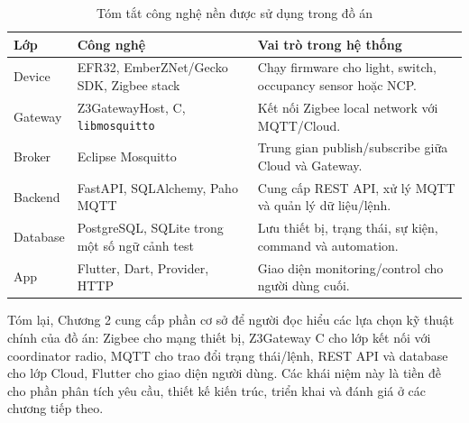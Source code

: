 \begin{table}[H]
\centering
\caption{Tóm tắt công nghệ nền được sử dụng trong đồ án}
\label{tab:ch2-tech-stack}
\begin{tabular}{|>{\raggedright\arraybackslash}p{2.8cm}|>{\raggedright\arraybackslash}p{4.2cm}|>{\raggedright\arraybackslash}p{6.2cm}|}
\hline
\textbf{Lớp} & \textbf{Công nghệ} & \textbf{Vai trò trong hệ thống} \\ \hline
Device & EFR32, EmberZNet/Gecko SDK, Zigbee stack & Chạy firmware cho light, switch, occupancy sensor hoặc NCP. \\ \hline
Gateway & Z3GatewayHost, C, \texttt{libmosquitto} & Kết nối Zigbee local network với MQTT/Cloud. \\ \hline
Broker & Eclipse Mosquitto & Trung gian publish/subscribe giữa Cloud và Gateway. \\ \hline
Backend & FastAPI, SQLAlchemy, Paho MQTT & Cung cấp REST API, xử lý MQTT và quản lý dữ liệu/lệnh. \\ \hline
Database & PostgreSQL, SQLite trong một số ngữ cảnh test & Lưu thiết bị, trạng thái, sự kiện, command và automation. \\ \hline
App & Flutter, Dart, Provider, HTTP & Giao diện monitoring/control cho người dùng cuối. \\ \hline
\end{tabular}
\end{table}

Tóm lại, Chương 2 cung cấp phần cơ sở để người đọc hiểu các lựa chọn kỹ thuật chính của đồ án: Zigbee cho mạng thiết bị, Z3Gateway C cho lớp kết nối với coordinator radio, MQTT cho trao đổi trạng thái/lệnh, REST API và database cho lớp Cloud, Flutter cho giao diện người dùng. Các khái niệm này là tiền đề cho phần phân tích yêu cầu, thiết kế kiến trúc, triển khai và đánh giá ở các chương tiếp theo.
